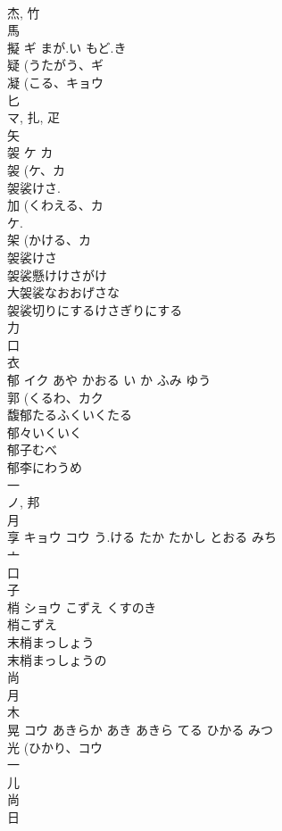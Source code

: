 \documentclass[8pt]{extreport}
\begin{document}
\begin{CJK}{UTF8}{min}
\\	杰, 竹 
\\	馬 
\\	擬	ギ	まが.い もど.き	
\\	疑 (うたがう、ギ 
\\	凝 (こる、キョウ 
\\	匕 
\\	マ, 扎, 疋 
\\	矢 
\\	袈	ケ カ		
\\	袈 (ケ、カ 
\\	袈裟けさ. 
\\	加 (くわえる、カ 
\\	ケ. 
\\	架 (かける、カ 
\\	袈裟けさ
\\	袈裟懸けけさがけ
\\	大袈裟なおおげさな
\\	袈裟切りにするけさぎりにする
\\	力 
\\	口 
\\	衣 
\\	郁	イク	あや かおる い か ふみ ゆう	
\\	郭 (くるわ、カク 
\\	馥郁たるふくいくたる
\\	郁々いくいく
\\	郁子むべ
\\	郁李にわうめ
\\	一 
\\	ノ, 邦 
\\	月 
\\	享	キョウ コウ	う.ける たか たかし とおる みち	
\\	亠 
\\	口 
\\	子 
\\	梢	ショウ	こずえ くすのき	
\\	梢こずえ 
\\	末梢まっしょう 
\\	末梢まっしょうの 
\\	尚 
\\	月 
\\	木 
\\	晃	コウ	あきらか あき あきら てる ひかる みつ	
\\	光 (ひかり、コウ 
\\	一 
\\	儿 
\\	尚 
\\	日 

\end{CJK}
\end{document}
